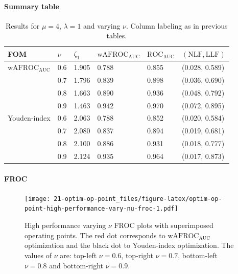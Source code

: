 \documentclass[
]{book}
\begin{document}
\hypertarget{summary-table-8}{%
\paragraph{Summary table}\label{summary-table-8}}

\begin{table}

\caption{\label{tab:optim-op-point-high-performance-vary-nu-table}Results for $\mu = 4$, $\lambda = 1$ and varying $\nu$. Column labeling as in previous tables.}
\centering
\fontsize{10}{12}\selectfont
\begin{tabular}[t]{llllll}
\toprule
FOM & $\nu$ & $\zeta_1$ & $\text{wAFROC}_\text{AUC}$ & $\text{ROC}_\text{AUC}$ & $\left( \text{NLF}, \text{LLF}\right)$\\
\midrule
$\text{wAFROC}_\text{AUC}$ & 0.6 & 1.905 & 0.788 & 0.855 & (0.028, 0.589)\\
 & 0.7 & 1.796 & 0.839 & 0.898 & (0.036, 0.690)\\
 & 0.8 & 1.663 & 0.890 & 0.936 & (0.048, 0.792)\\
 & 0.9 & 1.463 & 0.942 & 0.970 & (0.072, 0.895)\\
Youden-index & 0.6 & 2.063 & 0.788 & 0.852 & (0.020, 0.584)\\
\addlinespace
 & 0.7 & 2.080 & 0.837 & 0.894 & (0.019, 0.681)\\
 & 0.8 & 2.100 & 0.886 & 0.931 & (0.018, 0.777)\\
 & 0.9 & 2.124 & 0.935 & 0.964 & (0.017, 0.873)\\
\bottomrule
\end{tabular}
\end{table}

\hypertarget{froc-9}{%
\paragraph{FROC}\label{froc-9}}

\begin{figure}
\centering
\texttt{[image: 21-optim-op-point\_files/figure-latex/optim-op-point-high-performance-vary-nu-froc-1.pdf]}
\caption{\label{fig:optim-op-point-high-performance-vary-nu-froc}High performance varying \(\nu\) FROC plots with superimposed operating points. The red dot corresponds to \(\text{wAFROC}_\text{AUC}\) optimization and the black dot to Youden-index optimization. The values of \(\nu\) are: top-left \(\nu = 0.6\), top-right \(\nu = 0.7\), bottom-left \(\nu = 0.8\) and bottom-right \(\nu = 0.9\).}
\end{figure}
\end{document}
